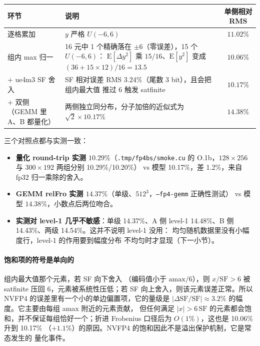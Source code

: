 \begin{center}
\footnotesize
\begin{tabular}{@{}p{2.5cm}p{7.6cm}c@{}}
\toprule
环节 & 说明 & 单侧相对 RMS \\
\midrule
逐格累加 & $y$ 严格 $U(-6,6)$ & $11.02\%$ \\
组内 max 归一 & 16 元中 1 个精确落在 $\pm6$（零误差），15 个 $U(-6,6)$：
  $\mathrm{E}[\Delta y^2]$ 乘 $15/16$、$\mathrm{E}[y^2]$ 变成
  $(36+15\times12)/16=13.5$ & $10.06\%$ \\
$+$ ue4m3 SF 舍入 & SF 相对误差 RMS $3.24\%$（尾数 3 bit），且会把组内最大值
  推过 $6$ 触发 satfinite & $10.17\%$ \\
\midrule
$+$ 双侧（GEMM 里 A、B 都量化） & 两侧独立同分布，分子加倍的近似式为
  $\sqrt{2}\times 10.17\%$ & $\mathbf{14.38\%}$ \\
\bottomrule
\end{tabular}
\end{center}

三个对照点都与实测一致：

\begin{itemize}[itemsep=2pt,topsep=3pt]
  \item \textbf{量化 round-trip 实测 $10.29\%$}（\texttt{.tmp/fp4bs/smoke.cu}
        的 O.1b，$128\times256$ 与 $300\times192$ 两组分别 10.29\%/10.20\%）
        vs 模型 10.17\%，差 1.2\%，来自 fp32 归一乘除的舍入。
  \item \textbf{GEMM relFro 实测 $14.37\%$}（单级、$512^3$，\texttt{--fp4-gemm} 正确性测试）
        vs 模型 $14.38\%$，小数点后两位吻合。
  \item \textbf{实测对 level-1 几乎不敏感}：单级 14.37\%、A 侧 level-1
        14.48\%、B 侧 14.43\%、两级 14.54\%。这并不说明 level-1 没用：
        均匀随机数据里没有小幅度行，level-1 的作用要到幅度分布
        不均匀时才显现（下一小节）。
\end{itemize}

\paragraph{饱和项的符号是单向的} 组内最大值那个元素，若 SF 向下舍入
（编码值小于 $\mathrm{amax}/6$），则 $x/\mathrm{SF} > 6$ 被 satfinite 压回
$6$，元素被系统性压低；若 SF 向上舍入，则该元素误差正常。所以
NVFP4 的误差里有一个小的单边偏置项，它的量级是
$|\Delta \mathrm{SF}/\mathrm{SF}| \approx 3.2\%$ 的幅度。它主要由每组 amax 附近的元素贡献，
但任何满足 $|x|>6\,\mathrm{SF}$ 的元素都会饱和，并不保证每组恰好一个；折进 Frobenius 口径后为 $O(1\%)$，这也是 10.06\% 升到 10.17\%
（$+1.1\%$）的原因。NVFP4 的饱和因此不是溢出保护机制，它是常态发生的
量化事件。

